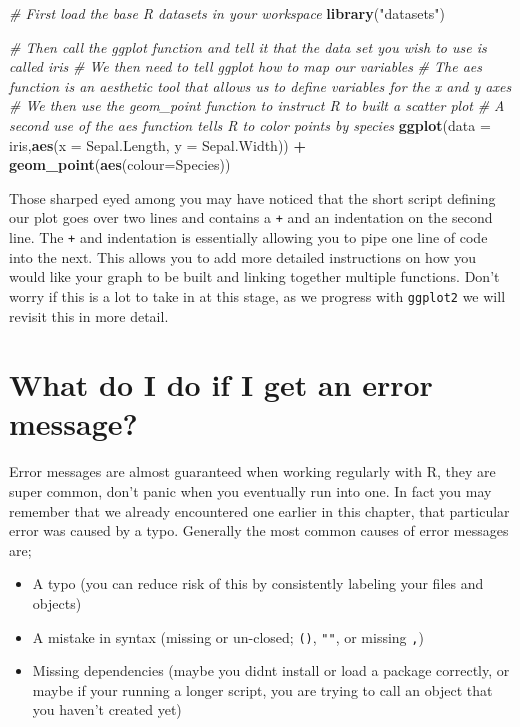 \documentclass[
]{book}
\newenvironment{Shaded}{\begin{snugshade}}{\end{snugshade}}
\newcommand{\AttributeTok}[1]{\textcolor[rgb]{0.13,0.29,0.53}{#1}}
\newcommand{\CommentTok}[1]{\textcolor[rgb]{0.56,0.35,0.01}{\textit{#1}}}
\newcommand{\FunctionTok}[1]{\textcolor[rgb]{0.13,0.29,0.53}{\textbf{#1}}}
\newcommand{\NormalTok}[1]{#1}
\newcommand{\SpecialCharTok}[1]{\textcolor[rgb]{0.81,0.36,0.00}{\textbf{#1}}}
\newcommand{\StringTok}[1]{\textcolor[rgb]{0.31,0.60,0.02}{#1}}
\providecommand{\tightlist}{%
  \setlength{\itemsep}{0pt}\setlength{\parskip}{0pt}}
\begin{document}
\begin{Shaded}
\begin{Highlighting}[]
\CommentTok{\# First load the base R datasets in your workspace}
\FunctionTok{library}\NormalTok{(}\StringTok{"datasets"}\NormalTok{)}

\CommentTok{\# Then call the ggplot function and tell it that the data set you wish to use is called iris}
\CommentTok{\# We then need to tell ggplot how to map our variables}
\CommentTok{\# The aes function is an aesthetic tool that allows us to define variables for the x and y axes}
\CommentTok{\# We then use the geom\_point function to instruct R to built a scatter plot}
\CommentTok{\# A second use of the aes function tells R to color points by species}
\FunctionTok{ggplot}\NormalTok{(}\AttributeTok{data =}\NormalTok{ iris,}\FunctionTok{aes}\NormalTok{(}\AttributeTok{x =}\NormalTok{ Sepal.Length, }\AttributeTok{y =}\NormalTok{ Sepal.Width)) }\SpecialCharTok{+} 
  \FunctionTok{geom\_point}\NormalTok{(}\FunctionTok{aes}\NormalTok{(}\AttributeTok{colour=}\NormalTok{Species)) }
\end{Highlighting}
\end{Shaded}

Those sharped eyed among you may have noticed that the short script defining our plot goes over two lines and contains a \texttt{+} and an indentation on the second line. The \texttt{+} and indentation is essentially allowing you to pipe one line of code into the next. This allows you to add more detailed instructions on how you would like your graph to be built and linking together multiple functions. Don't worry if this is a lot to take in at this stage, as we progress with \texttt{ggplot2} we will revisit this in more detail.

\hypertarget{what-do-i-do-if-i-get-an-error-message}{%
\section{What do I do if I get an error message?}\label{what-do-i-do-if-i-get-an-error-message}}

Error messages are almost guaranteed when working regularly with R, they are super common, don't panic when you eventually run into one. In fact you may remember that we already encountered one earlier in this chapter, that particular error was caused by a typo. Generally the most common causes of error messages are;

\begin{itemize}
\tightlist
\item
  A typo (you can reduce risk of this by consistently labeling your files and objects)
\item
  A mistake in syntax (missing or un-closed; \texttt{()}, \texttt{""}, or missing \texttt{,})
\item
  Missing dependencies (maybe you didnt install or load a package correctly, or maybe if your running a longer script, you are trying to call an object that you haven't created yet)
\end{itemize}
\end{document}
